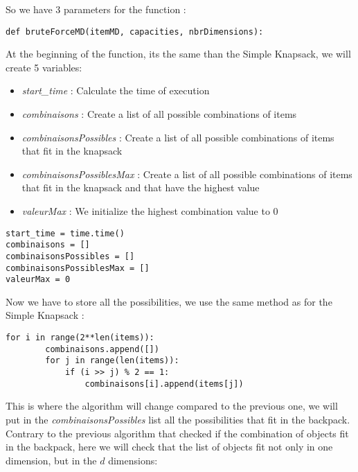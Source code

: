\documentclass[12pt]{article}
\begin{document}
            So we have 3 parameters for the function :

            \bigskip
            \begin{lstlisting}
def bruteForceMD(itemMD, capacities, nbrDimensions):
            \end{lstlisting}
            \bigskip

            At the beginning of the function, its the same than the Simple Knapsack, we will create 5 variables:
            \begin{itemize}
                \item \emph{start\_time} : Calculate the time of execution
                \item \emph{combinaisons} : Create a list of all possible combinations of items
                \item \emph{combinaisonsPossibles} : Create a list of all possible combinations of items that fit in the knapsack
                \item \emph{combinaisonsPossiblesMax} : Create a list of all possible combinations of items that fit in the knapsack and that have the highest value
                \item \emph{valeurMax} : We initialize the highest combination value to 0
            \end{itemize}

            \bigskip
            \begin{lstlisting}
start_time = time.time()
combinaisons = []
combinaisonsPossibles = []
combinaisonsPossiblesMax = []
valeurMax = 0
            \end{lstlisting}
            \bigskip

            \newpage
            Now we have to store all the possibilities, we use the same method as for the Simple Knapsack :

            \bigskip
            \begin{lstlisting}
for i in range(2**len(items)):
        combinaisons.append([])
        for j in range(len(items)):
            if (i >> j) % 2 == 1:
                combinaisons[i].append(items[j])
            \end{lstlisting}
            \bigskip

            This is where the algorithm will change compared to the previous one, we will put in the \emph{combinaisonsPossibles} list all the possibilities that fit in the backpack. Contrary to the previous algorithm that checked if the combination of objects fit in the backpack, here we will check that the list of objects fit not only in one dimension, but in the $d$ dimensions:
\end{document}

